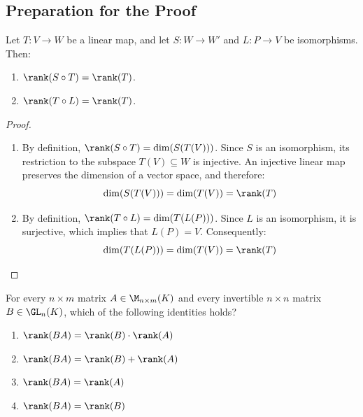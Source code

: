 \subsection{Preparation for the Proof}

\begin{lemma}
\label{lemma:rank_invariance_isomorphisms}
Let $T: V \to W$ be a linear map, and let $S: W \to W'$ and $L: P \to V$ be isomorphisms. Then:
\begin{enumerate}[label=\textbf{(\alph*)}]
    \item $\rank(S \circ T) = \rank(T)$.
    \item $\rank(T \circ L) = \rank(T)$.
\end{enumerate}
\end{lemma}

\begin{proof}
\begin{enumerate}[label=\textbf{(\alph*)}]
    \item By definition, $\rank(S \circ T) = \dim (S(T(V)))$. Since $S$ is an isomorphism, its restriction to the subspace $T(V) \subseteq W$ is injective. An injective linear map preserves the dimension of a vector space, and therefore:
    \begin{equation*}
        \dim (S(T(V))) = \dim (T(V)) = \rank(T)
    \end{equation*}

    \item By definition, $\rank(T \circ L) = \dim (T(L(P)))$. Since $L$ is an isomorphism, it is surjective, which implies that $L(P) = V$. Consequently:
    \begin{equation*}
        \dim (T(L(P))) = \dim (T(V)) = \rank(T)
    \end{equation*}
\end{enumerate}
\end{proof}

\begin{exercise}
\label{exc:rank_invariance_invertible_matrix_sc}
For every $n \times m$ matrix $A \in \M_{n \times m}(K)$ and every invertible $n \times n$ matrix $B \in \GL_n(K)$, which of the following identities holds?
\begin{enumerate}
    \item $\rank(BA) = \rank(B) \cdot \rank(A)$
    \item $\rank(BA) = \rank(B) + \rank(A)$
    \item $\rank(BA) = \rank(A)$
    \item $\rank(BA) = \rank(B)$
\end{enumerate}
\end{exercise}

